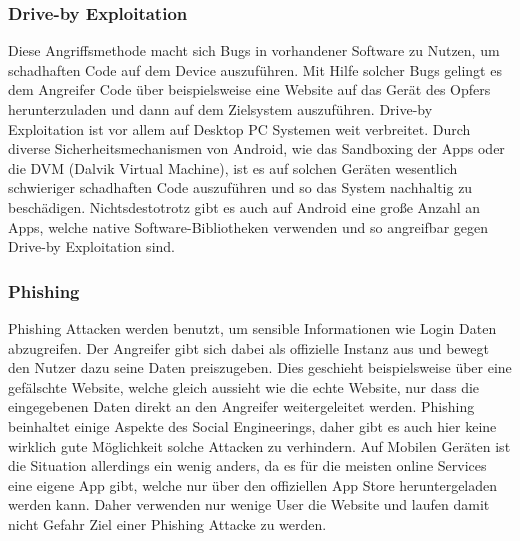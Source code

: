 \subsubsection{Drive-by Exploitation}
Diese Angriffsmethode macht sich Bugs in vorhandener Software zu Nutzen, um schadhaften Code auf dem Device auszuführen. Mit Hilfe solcher Bugs gelingt es dem Angreifer Code über beispielsweise eine Website auf das Gerät des Opfers herunterzuladen und dann auf dem Zielsystem auszuführen. Drive-by Exploitation ist vor allem auf Desktop PC Systemen weit verbreitet. Durch diverse Sicherheitsmechanismen von Android, wie das Sandboxing der Apps oder die DVM (Dalvik Virtual Machine), ist es auf solchen Geräten wesentlich schwieriger schadhaften Code auszuführen und so das System nachhaltig zu beschädigen. Nichtsdestotrotz gibt es auch auf Android eine große Anzahl an Apps, welche native Software-Bibliotheken verwenden und so angreifbar gegen Drive-by Exploitation sind.
\subsubsection{Phishing}
Phishing Attacken werden benutzt, um sensible Informationen wie Login Daten abzugreifen. Der Angreifer gibt sich dabei als offizielle Instanz aus und bewegt den Nutzer dazu seine Daten preiszugeben. Dies geschieht beispielsweise über eine gefälschte Website, welche gleich aussieht wie die echte Website, nur dass die eingegebenen Daten direkt an den Angreifer weitergeleitet werden. Phishing beinhaltet einige Aspekte des Social Engineerings, daher gibt es auch hier keine wirklich gute Möglichkeit solche Attacken zu verhindern. Auf Mobilen Geräten ist die Situation allerdings ein wenig anders, da es für die meisten online Services eine eigene App gibt, welche nur über den offiziellen App Store heruntergeladen werden kann. Daher verwenden nur wenige User die Website und laufen damit nicht Gefahr Ziel einer Phishing Attacke zu werden.


